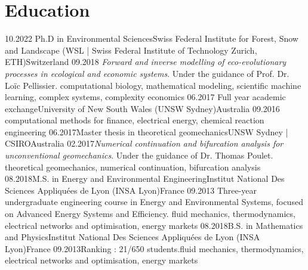 \section*{Education}
\begin{experiences}
    \experience
      {10.2022}   {Ph.D in Environmental Sciences}{Swiss Federal Institute for Forest, Snow and Landscape (WSL | Swiss Federal Institute of Technology Zurich, ETH)}{Switzerland}
      {09.2018} {\textit{Forward and inverse modelling of eco-evolutionary processes in ecological and economic systems}.
                      Under the guidance of Prof. Dr. Loïc Pellissier.
                      }
                      {computational biology, mathematical modeling, scientific machine learning, complex systems, complexity economics}
    \emptySeparator
    \experienceshort
      {06.2017} {Full year academic exchange}{University of New South Wales (UNSW Sydney)}{Australia}
      {09.2016} {computational methods for finance, electrical energy, chemical reaction engineering}
    \emptySeparator
    \experience
      {06.2017}{Master thesis in theoretical geomechanics}{UNSW Sydney | CSIRO}{Australia}
      {02.2017}{\textit{Numerical continuation and bifurcation analysis for unconventional geomechanics}. Under the guidance of Dr. Thomas Poulet.
                      }
                      {theoretical geomechanics, numerical continuation, bifurcation analysis}
    \emptySeparator
    \experience
    {08.2018}{M.S. in Energy and Environmental Engineering}{Institut National Des Sciences Appliquées de Lyon (INSA Lyon)}{France}
    {09.2013} {Three-year undergraduate engineering course in Energy and Environmental Systems, focused on Advanced Energy Systems and Efficiency.
    }{fluid mechanics, thermodynamics, electrical networks and optimisation, energy markets}
    \emptySeparator
    \experience
    {08.2018}{B.S. in Mathematics and Physics}{Institut National Des Sciences Appliquées de Lyon (INSA Lyon)}{France}
    {09.2013}{Ranking : 21/650 students.}{fluid mechanics, thermodynamics, electrical networks and optimisation, energy markets}
  \end{experiences}


